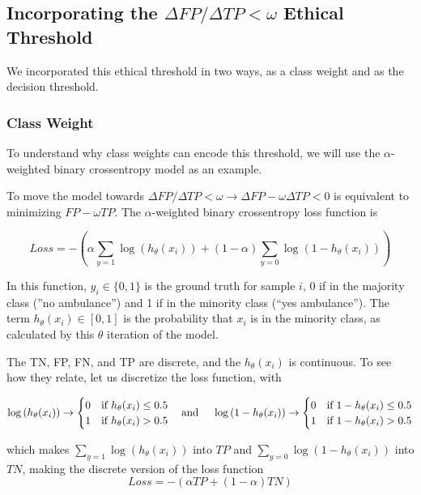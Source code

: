 \subsection{ Incorporating the $\Delta FP/\Delta TP < \omega$ Ethical Threshold}

We incorporated this ethical threshold in two ways, as a class weight and as the decision threshold.  

\subsubsection{Class Weight}

To understand why class weights can encode this threshold, we will use the $\alpha$-weighted binary crossentropy model as an example.  

To move the model towards $\Delta FP/\Delta TP < \omega \to \Delta FP - \omega\Delta TP < 0$ is equivalent to minimizing $FP - \omega TP$.  The $\alpha$-weighted binary crossentropy loss function is 

$$\displaystyle Loss = - \left(\alpha \sum_{y=1} \log \left( h_\theta (x_i) \right) + (1-\alpha) \sum_{y=0} \log \left(1 - h_\theta(x_i)\right)  \right)$$

In this function, $y_i \in \{0,1\}$ is the ground truth for sample $i$, 0 if in the majority class (''no ambulance'') and 1 if in the minority class (``yes ambulance'').  The term $h_\theta(x_i)\in [0,1]$ is the probability that $x_i$ is in the minority class, as calculated by this $\theta$ iteration of the model.

The TN, FP, FN, and TP are discrete, and the $h_\theta(x_i)$ is continuous.  To see how they relate, let us discretize the loss function, with 

$$
\log\left(h_\theta(x_i)\right) \to 
\begin{cases}
	0 & \text{if } h_\theta(x_i) \le 0.5 \cr
	1 & \text{if } h_\theta(x_i) > 0.5 \cr
\end{cases}
\text{\quad and \quad}
\log\left(1 - h_\theta(x_i)\right) \to 
\begin{cases}
	0 & \text{if } 1 - h_\theta(x_i) \le 0.5 \cr
	1 & \text{if } 1 - h_\theta(x_i) > 0.5 \cr
\end{cases}
$$

\noindent which makes $\displaystyle \sum_{y=1} \log ( h_\theta (x_i) )$ into $TP$ and  $\displaystyle \sum_{y=0} \log(1 - h_\theta(x_i))$ into $TN$, making the discrete version of the loss function
$$Loss = -\left(\alpha TP + (1-\alpha) TN\right)$$

